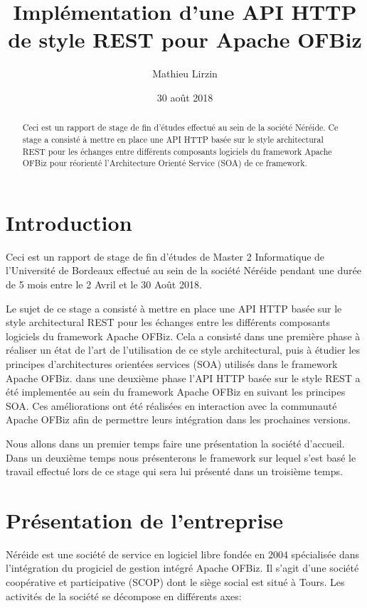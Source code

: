 \documentclass[a4paper, 11pt]{report}
\title{Implémentation d'une API HTTP de style REST pour Apache OFBiz}
\author{Mathieu Lirzin}
\date{30 août 2018}
\begin{document}
\maketitle

\begin{abstract}
  Ceci est un rapport de stage de fin d'études effectué au sein de la
  société Néréide. Ce stage a consisté à mettre en place une API HTTP
  basée sur le style architectural REST pour les échanges entre
  différents composants logiciels du framework Apache OFBiz pour
  réorienté l'Architecture Orienté Service (SOA) de ce framework.
\end{abstract}

\tableofcontents

\chapter*{Introduction}

Ceci est un rapport de stage de fin d'études de Master 2 Informatique
de l'Université de Bordeaux effectué au sein de la société Néréide
pendant une durée de 5 mois entre le 2 Avril et le 30 Août 2018.

Le sujet de ce stage a consisté à mettre en place une API HTTP basée
sur le style architectural REST pour les échanges entre les différents
composants logiciels du framework Apache OFBiz. Cela a consisté dans
une première phase à réaliser un état de l'art de l'utilisation de ce
style architectural, puis à étudier les principes d'architectures
orientées services (SOA) utilisés dans le framework Apache OFBiz.
dans une deuxième phase l'API HTTP basée sur le style REST a été
implementée au sein du framework Apache OFBiz en suivant les principes
SOA. Ces améliorations ont été réalisées en interaction avec la
communauté Apache OFBiz afin de permettre leurs intégration dans les
prochaines versions.

Nous allons dans un premier temps faire une présentation la société
d'accueil. Dans un deuxième temps nous présenterons le framework sur
lequel s'est basé le travail effectué lors de ce stage qui sera lui
présenté dans un troisième temps.

\chapter{Présentation de l'entreprise}

Néréide est une société de service en logiciel libre fondée en 2004
spécialisée dans l'intégration du progiciel de gestion intégré Apache
OFBiz.  Il s'agit d'une société coopérative et participative (SCOP)
dont le siège social est situé à Tours.  Les activités de la société
se décompose en différents axes:
\end{document}
